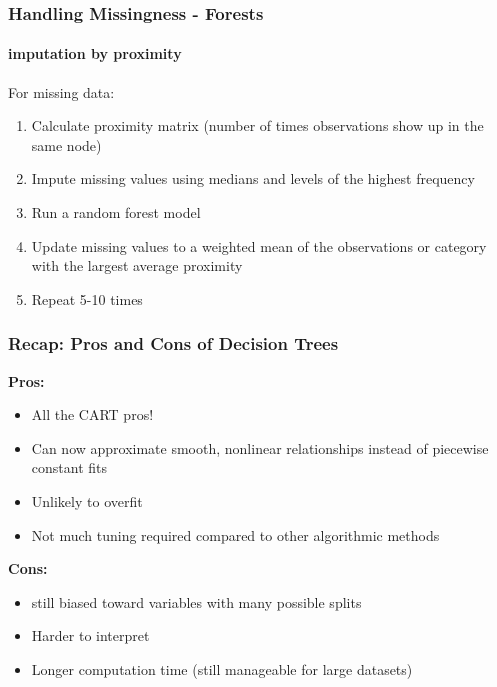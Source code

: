 \documentclass{beamer}\usepackage[]{graphicx}\usepackage[]{color}
\begin{document}

\begin{frame}
\frametitle{Handling Missingness - Forests}
\framesubtitle{imputation by proximity}

For missing data:

\begin{enumerate}
\item Calculate proximity matrix (number of times observations show up in the same node)
\item Impute missing values using medians and levels of the highest frequency
\item Run a random forest model
\item Update missing values to a weighted mean of the observations or category with the largest average proximity
\item Repeat 5-10 times
\end{enumerate}

\end{frame}


\begin{frame}
\frametitle{Recap: Pros and Cons of Decision Trees}

\textbf{Pros:}
\begin{itemize}
\item All the CART pros!
\item Can now approximate smooth, nonlinear relationships instead of piecewise constant fits
\item Unlikely to overfit
\item Not much tuning required compared to other algorithmic methods
\end{itemize}

\vspace{3ex}

\pause

\textbf{Cons:}
\begin{itemize}
\item still biased toward variables with many possible splits
\item Harder to interpret
\item Longer computation time (still manageable for large datasets)
\end{itemize}

\end{frame}

\end{document}
